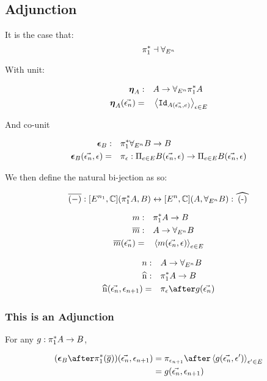 \documentclass{report}
\begin{document}
\subsection{Adjunction}
It is the case that:
$$\pi_1^* \dashv \forall_{E^n}$$

With unit:

\begin{align}
    \boldsymbol{\eta}_{A}:&\quad A \rightarrow \forall_{E^n}\pi_1^* A\\
    \boldsymbol{\eta}_{A}(\vec{\epsilon_n})=&\quad\left\langle\texttt{Id}_{A(\vec{\epsilon_n},e)}\right\rangle_{\epsilon\in E}
\end{align}


And co-unit


\begin{align}
    \boldsymbol{\epsilon}_{B} : &\quad \pi_1^*\forall_{E^n} B \rightarrow B\\
    \boldsymbol{\epsilon}_{B}(\vec{\epsilon_n}, \epsilon) =&\quad \pi_\epsilon : \Pi_{e\in E}B(\vec{\epsilon_n}, \epsilon)\rightarrow \Pi_{e\in E}B(\vec{\epsilon_n}, \epsilon)
\end{align}


We then define the natural bi-jection as so:

\begin{equation}
    \bar{(-)}: [E^{n_1}, \C](\pstar A, B) \leftrightarrow [E^n,\C] (A, \allEn B): \widehat{(-)}
\end{equation}

\begin{align}
    m:&\quad \pi_1^* A \rightarrow B\\
    \overline{m}:&\quad A\rightarrow \forall_{E^n} B\\
    \overline{m}(\vec{\epsilon_n}) =&\quad \left\langle m(\vec{\epsilon_n}, \epsilon)\right\rangle_{e\in E}
\end{align}


\begin{align}
    n:&\quad A \rightarrow \allEn B\\
    \widehat{n}:&\quad \pstar A\rightarrow B\\
    \widehat{n}(\env, \e_{n+1}) =&\quad\pi_\e\after g(\env)
\end{align}

\subsubsection{This is an Adjunction}
For any $g: \pi_1^* A \rightarrow B$,

\begin{align}
    (\counit{B}\after\pstar(\bar{g}))(\env, \e_{n+1}) & = \pi_{\e_{n+1}}\after\finpr{g(\env, \e')}{\e'\in E}\\
    &= g(\env, \e_{n+1})
\end{align}
\end{document}
